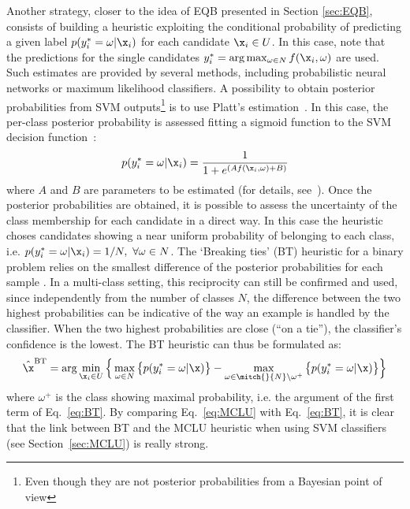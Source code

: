 Another strategy, closer to the idea of EQB presented in Section \ref{sec:EQB}, consists of building a heuristic exploiting the conditional probability of predicting a given label $p(y_i^* = \omega|\x_i)$ for each candidate $\x_i \in U$. In this case, note that the predictions for the single candidates $y_i^* = \arg\max_{\omega \in N}f(\x_i,\omega)$ are used. Such estimates are provided by several methods, including probabilistic neural networks or maximum likelihood classifiers. A possibility to obtain posterior probabilities from SVM outputs\footnote{Even though they are not posterior probabilities from a Bayesian point of view} is to use Platt's estimation~. 
In this case, the per-class posterior probability is assessed fitting a sigmoid function to the SVM decision function~:
\begin{equation}
	p(y_i^* = \omega|\x_i) =\frac{1}{1 + e^{(Af(\x_i,\omega)+B)}}
\end{equation}
 where $A$ and $B$ are parameters to be estimated (for details, see~). 
Once the posterior probabilities are obtained, it is possible to assess the uncertainty of the class membership for each candidate in a direct way. In this case the heuristic choses candidates showing a near uniform probability of belonging to each class, i.e. $p( y_i^* = \omega | \x_i) = 1/N, \  \forall \omega \in N$.
The `Breaking ties' (BT) heuristic for a binary problem relies on the smallest difference of the posterior probabilities for each sample . In a multi-class setting, this reciprocity can still be confirmed and used, since independently from the number of classes $N$, the difference between the two highest probabilities can be indicative of the way an example is handled by the classifier. When the two highest probabilities are close (``on a tie''),  the classifier's confidence is the lowest. The BT heuristic can thus  be formulated as:
\begin{equation}
\hat{\x}^{\text{BT}} = \arg \min_{\x_i \in U } \Big\{\max_{\omega \in N} \big\{p(y_i^* = \omega|\x)\big\} - \max_{\omega \in \mitch{}{N}\backslash \omega^+} \big\{p(y_i^* = \omega|\x)\big\}\Big\}
\label{eq:BT}
\end{equation}
where $\omega^+$ is the class showing maximal probability, i.e. the argument of the first term of Eq.~\eqref{eq:BT}. By comparing Eq.~\eqref{eq:MCLU} with Eq.~\eqref{eq:BT}, it is clear that the link between BT and the MCLU heuristic when using SVM classifiers (see Section~\ref{sec:MCLU}) is really strong.

